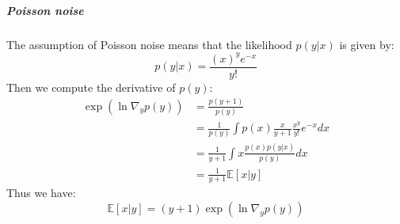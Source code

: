 \subparagraph{Poisson noise}

The assumption of Poisson noise means that the likelihood $p(y|x)$ is given by:
\begin{equation*}
    p(y|x) = \frac{(x)^{y} e^{-x}}{y!}
\end{equation*}
Then we compute the derivative of $p(y)$:
\begin{align*}
    \exp(\ln \nabla_y p(y)) &= \frac{p(y+1)}{p(y)} \\
    &= \frac{1}{p(y)} \int p(x) \frac{x}{y+1}\frac{x^y}{y!}e^{-x} dx \\
    &= \frac{1}{y+1} \int x \frac{p(x) p(y|x)}{p(y)} dx \\
    &= \frac{1}{y+1} \mathbb{E}[x|y]
\end{align*}
Thus we have:
\begin{equation*}
    \mathbb{E}[x|y] = (y+1) \exp(\ln \nabla_y p(y))
\end{equation*}